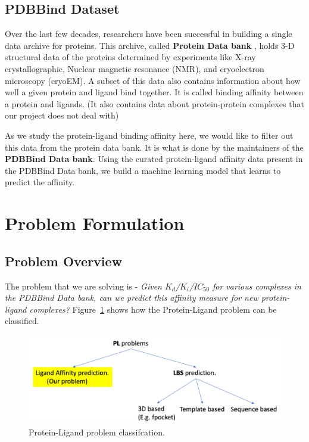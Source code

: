 \documentclass[11pt]{article}
\begin{document}
\subsection{PDBBind Dataset}
Over the last few decades, researchers have been successful in building a single data archive for proteins.  This archive, called \textbf{Protein Data bank} \cite{pdb_homepage} , holds 3-D structural data of the proteins determined by experiments like X-ray crystallographic, Nuclear magnetic resonance (NMR), and cryoelectron microscopy (cryoEM).  A subset of this data also contains information about how well a given protein and ligand bind together.  It is called binding affinity between a protein and ligands.  (It also contains data about protein-protein complexes that our project does not deal with)
\cite{pdbank_history}

As we study the protein-ligand binding affinity here, we would like to filter out this data from the protein data bank.  It is what is done by the maintainers of the \textbf{PDBBind Data bank}.
\cite{pdbbind_introduction}
Using the curated protein-ligand affinity data present in the PDBBind Data bank, we build a machine learning model that learns to predict the affinity. 

\section{Problem Formulation}
\subsection{Problem Overview}
\label{ProblemOverviewlabel}
The problem that we are solving is - \textit{Given $K_d$/$K_i$/$IC_{50}$ for various complexes in the PDBBind Data bank,
can we predict this affinity measure for new protein-ligand complexes?}
Figure~\ref{fig:plproblemclassification} shows how the Protein-Ligand problem can be classified.

\begin{figure}[htb]
  \centering
    \includegraphics[scale=0.35]{images/pl_problem_classification}
    \caption{Protein-Ligand problem classifcation.}
    \label{fig:plproblemclassification}
\end{figure}
\end{document}
